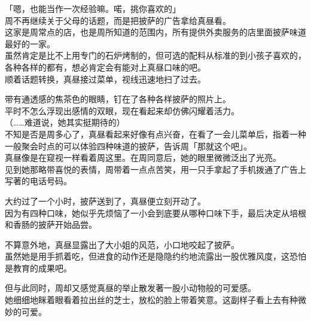「嗯，也能当作一次经验嘛。喏，挑你喜欢的」\\

周不再继续关于父母的话题，而是把披萨的广告拿给真昼看。\\

这家是周常点的店，也是周所知道的范围内，所有提供外卖服务的店里面披萨味道最好的一家。\\

虽然肯定是比不上用专门的石炉烤制的，但可选的配料从标准的到小孩子喜欢的，各种各样的都有，想必肯定会有能对上真昼口味的吧。\\%

顺着话题转换，真昼接过菜单，视线迅速地扫了过去。

带有通透感的焦茶色的眼睛，钉在了各种各样披萨的照片上。\\

平时不怎么浮现出感情的双眼，现在看起来却仿佛闪耀着活力。\\

（……难道说，她其实挺期待的）\\

不知是否是周多心了，真昼看起来好像有点兴奋，在看了一会儿菜单后，指着一种一般聚会时点的可以体验四种味道的披萨，告诉周「那就这个吧」。\\

真昼像是在窥视一样看着周这里。在周同意后，她的眼里微微泛出了光亮。\\

见到她那略带喜悦的表情，周带着一点点苦笑，用一只手拿起了手机拨通了广告上写著的电话号码。\\

\vspace{2\baselineskip}

大约过了一个小时，披萨送到了，真昼便立刻开动了。\\

因为有四种口味，她似乎先烦恼了一小会到底要从哪种口味下手，最后决定从培根和香肠的披萨开始品尝。

不算意外地，真昼显露出了大小姐的风范，小口地咬起了披萨。\\%

虽然她是用手抓着吃，但进食的动作还是隐隐约约地流露出一股优雅风度，这恐怕是教育的成果吧。

但与此同时，周却又感觉真昼的举止散发著一股小动物般的可爱感。\\

她细细地眯着眼看着拉出丝的芝士，放松的脸上带着笑意。这副样子看上去有种微妙的可爱。\\

